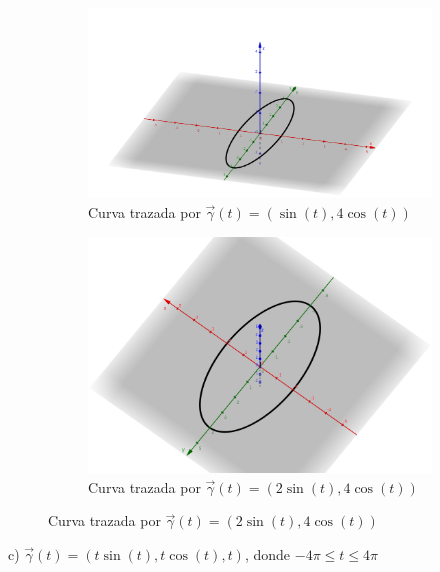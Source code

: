 \documentclass[letterpaper]{article}
\renewcommand{\*}{\cdot}
\theoremstyle{definition}
\begin{document}
\begin{figure}[h!]
	\centering
	\begin{subfigure}[b]{0.4\linewidth}
		\includegraphics[width=\textwidth]{img/proyecto4_5.png}
		\caption{Curva trazada por $ \vec{\gamma}(t) = (\sin(t), 4\cos(t))$}
	\end{subfigure}
	\begin{subfigure}[b]{0.4\linewidth}
		\includegraphics[width=\textwidth]{img/Proyecto4_6.png}
		\caption{Curva trazada por $ \vec{\gamma}(t)= (2\sin(t), 4\cos(t)) $}
	\end{subfigure}
\end{figure}

\noindent c) $\vec{\gamma}(t) = (t\sin(t), t\cos(t), t)$, donde $ -4\pi \leq t \leq 4\pi$\\
\end{document}

